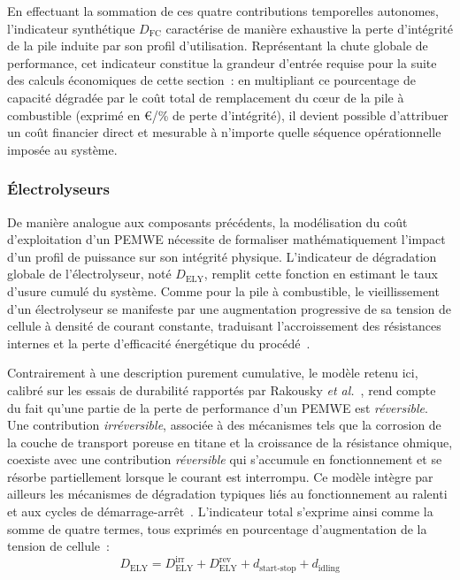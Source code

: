 En effectuant la sommation de ces quatre contributions temporelles autonomes, l'indicateur synthétique $D_{\text{FC}}$ caractérise de manière exhaustive la perte d'intégrité de la pile induite par son profil d'utilisation. Représentant la chute globale de performance, cet indicateur constitue la grandeur d'entrée requise pour la suite des calculs économiques de cette section~: en multipliant ce pourcentage de capacité dégradée par le coût total de remplacement du c\oe ur de la pile à combustible (exprimé en €/\% de perte d'intégrité), il devient possible d'attribuer un coût financier direct et mesurable à n'importe quelle séquence opérationnelle imposée au système.

\subsubsection{Électrolyseurs}

De manière analogue aux composants précédents, la modélisation du coût d'exploitation d'un PEMWE nécessite de formaliser mathématiquement l'impact d'un profil de puissance sur son intégrité physique. L'indicateur de dégradation globale de l'électrolyseur, noté $D_{\text{ELY}}$, remplit cette fonction en estimant le taux d'usure cumulé du système. Comme pour la pile à combustible, le vieillissement d'un électrolyseur se manifeste par une augmentation progressive de sa tension de cellule à densité de courant constante, traduisant l'accroissement des résistances internes et la perte d'efficacité énergétique du procédé~\cite{endrodi_challenges_2025}\cite{kuhnert_impact_2024}.

Contrairement à une description purement cumulative, le modèle retenu ici, calibré sur les essais de durabilité rapportés par Rakousky \textit{et al.}~\cite{rakousky_polymer_2017}, rend compte du fait qu'une partie de la perte de performance d'un PEMWE est \emph{réversible}. Une contribution \emph{irréversible}, associée à des mécanismes tels que la corrosion de la couche de transport poreuse en titane et la croissance de la résistance ohmique, coexiste avec une contribution \emph{réversible} qui s'accumule en fonctionnement et se résorbe partiellement lorsque le courant est interrompu. Ce modèle intègre par ailleurs les mécanismes de dégradation typiques liés au fonctionnement au ralenti et aux cycles de démarrage-arrêt~\cite{kuhnert_impact_2024}. L'indicateur total s'exprime ainsi comme la somme de quatre termes, tous exprimés en pourcentage d'augmentation de la tension de cellule~:
\begin{equation}
    D_{\text{ELY}} = D_{\text{ELY}}^{\text{irr}} + D_{\text{ELY}}^{\text{rev}} + d_{\text{start-stop}} + d_{\text{idling}}
    \label{eq:degradation_el}
\end{equation}

